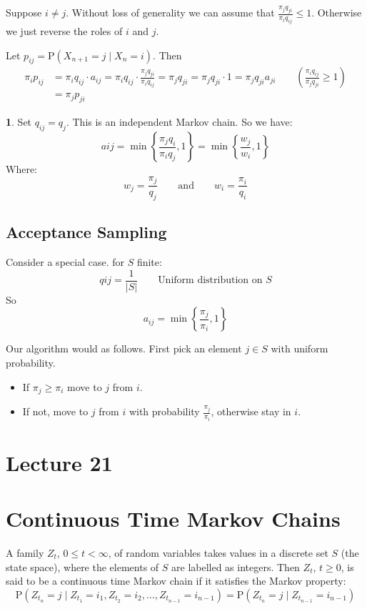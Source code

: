 \documentclass[english,12pt]{article}
\theoremstyle{plain}
\theoremstyle{definition}
\newtheorem*{example}{\protect\examplename}
\theoremstyle{definition} %
\newcommand{\eg}[1]{\begin{example} #1 \end{example} }
\providecommand{\examplename}{Example}
\newcommand{\brac}[1]{\left(#1\right)} %
\newcommand{\curlybrac}[1]{\left\{#1\right\}} %
\begin{document}
Suppose $i\ne j$.  Without loss of generality we can assume that $\frac{\pi_jq_{ji}}{\pi_iq_{ij}}\le 1$.  Otherwise we just reverse the roles of $i$ and $j$.

Let $p_{ij}=\text{P}(X_{n+1}=j\mid X_n=i)$.  Then
\begin{align*}
\pi_ip_{ij}&=\pi_i q_{ij}\cdot a_{ij}
=\pi_i q_{ij}\cdot \frac{\pi_j q_{ji}}{\pi_i q_{ij}}
=\pi_j q_{ji}
=\pi_j q_{ji}\cdot 1
=\pi_j q_{ji} a_{ji} \qquad \brac{\frac{\pi_iq_{ij}}{\pi_j q_{ji}}\ge 1}\\
&=\pi_j p_{ji}
\end{align*}

\eg{
Set $q_{ij}=q_j$.  This is an independent Markov chain.  So we have:
\[a{ij}=\min\curlybrac{\frac{\pi_jq_i}{\pi_iq_j},1}=\min\curlybrac{\frac{w_j}{w_i},1}\]
Where:
\[w_j=\frac{\pi_j}{q_j}\qquad \text{and}\qquad w_i=\frac{\pi_i}{q_i}\]
}

\subsection{Acceptance Sampling}
Consider a special case.  for $S$ finite:
\[q{ij}=\frac{1}{|S|}\qquad \text{Uniform distribution on }S\]
So
\[a_{ij}=\min\curlybrac{\frac{\pi_j}{\pi_i},1}\]

Our algorithm would as follows.  First pick an element $j\in S$ with uniform probability.
\begin{itemize}
\item If $\pi_j\ge\pi_i$ move to $j$ from $i$.
\item If not, move to $j$ from $i$ with probability $\frac{\pi_j}{\pi_i}$, otherwise stay in $i$.
\end{itemize}

\section*{Lecture 21}
\section{Continuous Time Markov Chains}
A family $Z_t$, $0\le t<\infty$, of random variables takes values in a discrete set $S$ (the state space), where the elements of $S$ are labelled as integers.  Then $Z_t$, $t\ge 0$, is said to be a continuous time Markov chain if it satisfies the Markov property:
\[\text{P}(Z_{t_n}=j\mid Z_{t_1}=i_1,Z_{t_2}=i_2,\ldots, Z_{t_{n-1}}=i_{n-1})=\text{P}(Z_{t_n}=j\mid Z_{t_{n-1}}=i_{n-1})\]
\end{document}

